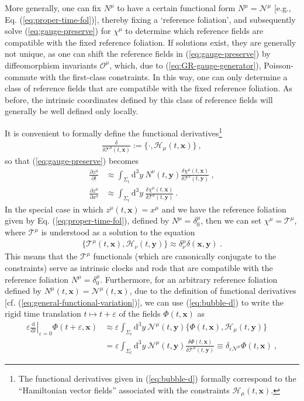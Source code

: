 \documentclass[12pt]{iopart}
\def\eq#1{\begin{equation}\begin{aligned}#1\end{aligned}\end{equation}}
\def\eref#1{(\ref{eq:#1})}
\def\D{\mathrm{d}}
\def\del#1#2{\frac{\partial#1}{\partial#2}}
\def\Del#1#2{\frac{\D#1}{\D#2}}
\def\Ob{\mathcal{O}}
\def\N{\mathcal{N}}
\def\x{\mathbf{x}}
\def\y{\mathbf{y}}
\begin{document}
More generally, one can fix $N^{\mu}$ to have a certain functional form $N^{\mu}=\N^{\mu}$ [e.g., Eq. \eref{proper-time-fol}], thereby fixing a `reference foliation', and subsequently solve \eref{gauge-preserve} for $\chi^{\mu}$ to determine which reference fields are compatible with the fixed reference foliation. If solutions exist, they are generally not unique, as one can shift the reference fields in \eref{gauge-preserve} by diffeomorphism invariants $\Ob^{\mu}$, which, due to \eref{GR-gauge-generator}, Poisson-commute with the first-class constraints. In this way, one can only determine a class of reference fields that are compatible with the fixed reference foliation. As before, the intrinsic coordinates defined by this class of reference fields will generally be well defined only locally. 

It is convenient to formally define the functional derivatives\footnote{The functional derivatives given in \eref{bubble-d} formally correspond to the ``Hamiltonian vector fields'' associated with the constraints $\mathcal{H}_{\mu}(t,\x)$.}
\eq{\label{eq:bubble-d}
\frac{\delta}{\delta\mathcal{T}^{\mu}(t,\x)} := \{\cdot,\mathcal{H}_{\mu}(t,\x)\} \ ,
}
so that \eref{gauge-preserve} becomes
\eq{\label{eq:gauge-preserve-T}
\del{z^{\mu}}{t} & \approx \int_{\Sigma_t}\D^3y\ N^{\nu}(t,\y)\frac{\delta\chi^{\mu}(t,\x)}{\delta\mathcal{T}^{\nu}(t,\y)} \ , \\
\del{z^{\mu}}{x^a} &\approx \int_{\Sigma_t}\D^3y\ \frac{\delta\chi^{\mu}(t,\x)}{\delta\mathcal{T}^{a}(t,\y)} \ .
}
In the special case in which $z^{\mu}(t,\x) = x^{\mu}$ and we have the reference foliation given by Eq. \eref{proper-time-fol}, defined by $N^{\mu} = \delta^{\mu}_0$, then we can set $\chi^{\mu}=\mathcal{T}^{\mu}$, where $\mathcal{T}^{\mu}$ is understood as a solution to the equation
\eq{\label{eq:gauge-preserve-proper-s}
\{\mathcal{T}^{\mu}(t,\x),\mathcal{H}_{\nu}(t,\y)\} \approx \delta^{\mu}_{\nu}\delta(\x,\y) \ .
}
This means that the $\mathcal{T}^{\mu}$ functionals (which are canonically conjugate to the constraints) serve as intrinsic clocks and rods that are compatible with the reference foliation $N^{\mu} = \delta^{\mu}_0$. Furthermore, for an arbitrary reference foliation defined by $N^{\mu}(t,\x) = \mathcal{N}^{\mu}(t,\x)$, due to the definition of functional derivatives [cf. \eref{general-functional-variation}], we can use \eref{bubble-d} to write the rigid time translation $t\mapsto t+\varepsilon$ of the fields $\Phi(t,\x)$ as
\eq{\label{eq:bubble-evol}
\varepsilon\left.\Del{}{t}\right|_{\varepsilon=0} \Phi(t+\varepsilon,\x) &\approx \varepsilon\int_{\Sigma_t}\D^3y\ \mathcal{N}^{\mu}(t,\y)\{\Phi(t,\x),\mathcal{H}_{\mu}(t,\y)\}\\
&= \varepsilon\int_{\Sigma_t}\D^3y\ \mathcal{N}^{\mu}(t,\y)\frac{\delta\Phi(t,\x)}{\delta\mathcal{T}^{\mu}(t,\y)} \equiv \delta_{\varepsilon\mathcal{N}^{\mu}}\Phi(t,\x) \ ,
}
\end{document}
